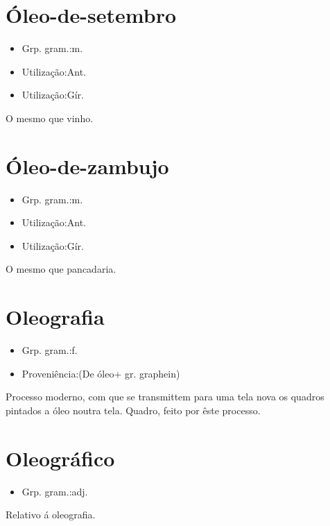 \section{Óleo-de-setembro}
\begin{itemize}
\item {Grp. gram.:m.}
\end{itemize}
\begin{itemize}
\item {Utilização:Ant.}
\end{itemize}
\begin{itemize}
\item {Utilização:Gír.}
\end{itemize}
O mesmo que \textunderscore vinho\textunderscore .
\section{Óleo-de-zambujo}
\begin{itemize}
\item {Grp. gram.:m.}
\end{itemize}
\begin{itemize}
\item {Utilização:Ant.}
\end{itemize}
\begin{itemize}
\item {Utilização:Gír.}
\end{itemize}
O mesmo que \textunderscore pancadaria\textunderscore .
\section{Oleografia}
\begin{itemize}
\item {Grp. gram.:f.}
\end{itemize}
\begin{itemize}
\item {Proveniência:(De \textunderscore óleo\textunderscore  + gr. \textunderscore graphein\textunderscore )}
\end{itemize}
Processo moderno, com que se transmittem para uma tela nova os quadros pintados a óleo noutra tela.
Quadro, feito por êste processo.
\section{Oleográfico}
\begin{itemize}
\item {Grp. gram.:adj.}
\end{itemize}
Relativo á oleografia.
